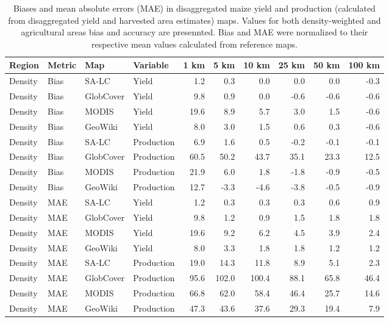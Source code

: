 \begin{longtable}{llllrrrrrr}
\caption{Biases and mean absolute errors (MAE) in disaggregated maize yield and production (calculated from disaggregated yield and harvested area estimates) maps. Values for both density-weighted and agricultural areas bias and accuracy are presennted. Bias and MAE were normalized to their respective mean values calculated from reference maps.} \\ 
  \hline
Region & Metric & Map & Variable & 1 km & 5 km & 10 km & 25 km & 50 km & 100 km \\ 
  \hline
Density & Bias & SA-LC & Yield & 1.2 & 0.3 & 0.0 & 0.0 & 0.0 & -0.3 \\ 
  Density & Bias & GlobCover & Yield & 9.8 & 0.9 & 0.0 & -0.6 & -0.6 & -0.6 \\ 
  Density & Bias & MODIS & Yield & 19.6 & 8.9 & 5.7 & 3.0 & 1.5 & -0.6 \\ 
  Density & Bias & GeoWiki & Yield & 8.0 & 3.0 & 1.5 & 0.6 & 0.3 & -0.6 \\ 
  Density & Bias & SA-LC & Production & 6.9 & 1.6 & 0.5 & -0.2 & -0.1 & -0.1 \\ 
  Density & Bias & GlobCover & Production & 60.5 & 50.2 & 43.7 & 35.1 & 23.3 & 12.5 \\ 
  Density & Bias & MODIS & Production & 21.9 & 6.0 & 1.8 & -1.8 & -0.9 & -0.5 \\ 
  Density & Bias & GeoWiki & Production & 12.7 & -3.3 & -4.6 & -3.8 & -0.5 & -0.9 \\ 
  Density & MAE & SA-LC & Yield & 1.2 & 0.3 & 0.3 & 0.3 & 0.6 & 0.9 \\ 
  Density & MAE & GlobCover & Yield & 9.8 & 1.2 & 0.9 & 1.5 & 1.8 & 1.8 \\ 
  Density & MAE & MODIS & Yield & 19.6 & 9.2 & 6.2 & 4.5 & 3.9 & 2.4 \\ 
  Density & MAE & GeoWiki & Yield & 8.0 & 3.3 & 1.8 & 1.8 & 1.2 & 1.2 \\ 
  Density & MAE & SA-LC & Production & 19.0 & 14.3 & 11.8 & 8.9 & 5.1 & 2.3 \\ 
  Density & MAE & GlobCover & Production & 95.6 & 102.0 & 100.4 & 88.1 & 65.8 & 46.4 \\ 
  Density & MAE & MODIS & Production & 66.8 & 62.0 & 58.4 & 46.4 & 25.7 & 14.6 \\ 
  Density & MAE & GeoWiki & Production & 47.3 & 43.6 & 37.6 & 29.3 & 19.4 & 7.9 \\ 

\end{longtable}

